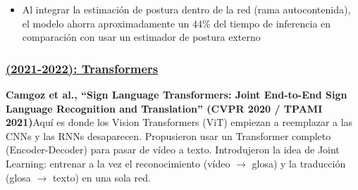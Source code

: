 \documentclass[11pt,a4paper]{article}
\begin{document}
\begin{itemize}
\begin{itemize}
\begin{itemize}
			\item \textbf{CSL}: Supera al mejor competidor por un $4.1\%$ en WER
			\item \textbf{PHOENIX-2014-T:} Supera a todas las combinaciones del modelo CNN-LSTM-HMM.
		\end{itemize}
		\item Al integrar la estimación de postura dentro de la red (rama autocontenida), el modelo ahorra aproximadamente un $44\%$ del tiempo de inferencia en comparación con usar un estimador de postura externo
	\end{itemize}
\end{itemize}

\subsubsection{\underline{(2021-2022): Transformers}}
\textbf{Camgoz et al., ``Sign Language Transformers: Joint End-to-End Sign Language Recognition and Translation'' (CVPR 2020 / TPAMI 2021)}Aquí es donde los Vision Transformers (ViT) empiezan a reemplazar a las CNNs y las RNNs desaparecen. Propusieron usar un Transformer completo (Encoder-Decoder) para pasar de vídeo a texto. Introdujeron la idea de Joint Learning: entrenar a la vez el reconocimiento (vídeo $\to$ glosa) y la traducción (glosa $\to$ texto) en una sola red. 
\end{document}
